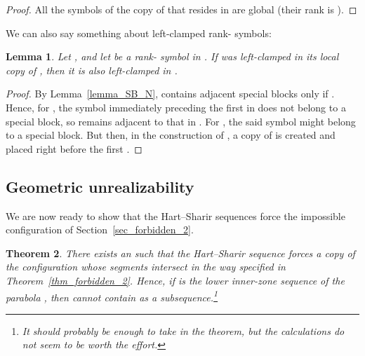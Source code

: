 \documentclass[11pt]{article}
\newtheorem{theorem}{Theorem}[section]
\newtheorem{lemma}[theorem]{Lemma}
\theoremstyle{definition}
\theoremstyle{remark}
\begin{document}
\begin{proof}
All the symbols of the copy of  that resides in  are global (their rank is ).
\end{proof}

We can also say something about left-clamped rank- symbols:

\begin{lemma}\label{lem_rank1_leftclamped}
Let , and let  be a rank- symbol in . If  was left-clamped in its local copy of , then it is also left-clamped in .
\end{lemma}

\begin{proof}
By Lemma~\ref{lemma_SB_N},  contains adjacent special blocks only if . Hence, for , the symbol  immediately preceding the first  in  does not belong to a special block, so  remains adjacent to that  in . For , the said symbol  might belong to a special block. But then, in the construction of , a copy of  is created and placed right before the first .
\end{proof}

\subsection{Geometric unrealizability}

We are now ready to show that the Hart--Sharir sequences force the impossible configuration  of Section~\ref{sec_forbidden_2}.

\begin{theorem}\label{thm_HS_forces_X}
There exists an  such that the Hart--Sharir sequence  forces a copy of the configuration  whose segments intersect in the way specified in Theorem~\ref{thm_forbidden_2}. Hence, if  is the lower inner-zone sequence of the parabola , then  cannot contain  as a subsequence.\footnote{It should probably be enough to take  in the theorem, but the calculations do not seem to be worth the effort.}
\end{theorem}
\end{document}

